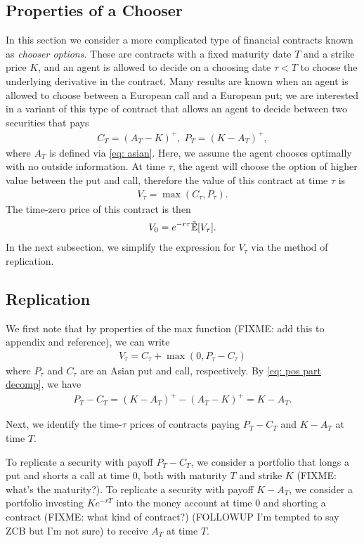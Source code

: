 \documentclass[reqno]{amsart}
\begin{document}
\subsection{Properties of a Chooser}
In this section we consider a more complicated type of financial contracts known as \emph{chooser options}. 
These are contracts with a fixed maturity date $T$ and a strike price $K$, and an agent is allowed to decide on a choosing date $\tau < T$ to choose the underlying derivative in the contract.
Many results are known when an agent is allowed to choose between a European call and a European put; we are interested in a variant of this type of contract that allows an agent to decide between two securities that pays 
\begin{align}
     C_T = (A_T - K)^+, \; P_T = (K - A_T)^+,
\end{align}
where $A_T$ is defined via \eqref{eq: asian}.
Here, we assume the agent chooses optimally with no outside information. At time $\tau$, the agent will choose the option of higher value between the put and call, therefore the value of this contract at time $\tau$ is 
\begin{align}\label{eq: V_tau}
     V_\tau = \max(C_\tau, P_\tau).
\end{align}
The time-zero price of this contract is then 
\begin{align}
      V_0 = e^{-r\tau}\tilde{\mathbb{E}}[V_\tau].
\end{align}
In the next subsection, we simplify the expression for $V_\tau$ via the method of replication. 
\subsection{Replication}
We first note that by properties of the max function (FIXME: add this to appendix and reference), we can write 
\begin{align}\label{eq: chooser formula PC}
     V_\tau = C_\tau + \max(0, P_\tau - C_\tau)
\end{align}
where $P_\tau$ and $C_\tau$ are an Asian put and call, respectively.
By \eqref{eq: pos part decomp}, we have
\begin{align}\label{eq: P - C}
     P_T - C_T = (K-A_T)^+ - (A_T - K)^+ = K - A_T. 
\end{align}

Next, we identify the time-$\tau$ prices of contracts paying $P_T - C_T$ and $K - A_T$ at time $T$.

To replicate a security with payoff $P_T - C_T$, we consider a portfolio that longs a put and shorts a call at time $0$, both with maturity $T$ and strike $K$ (FIXME: what's the maturity?). To replicate a security with payoff $K - A_T$,  we consider a portfolio investing $Ke^{-rT}$ into the money account at time 0 and shorting a contract (FIXME: what kind of contract?) (FOLLOWUP I'm tempted to say ZCB but I'm not sure) to receive $A_T$ at time $T$. 
\end{document}
